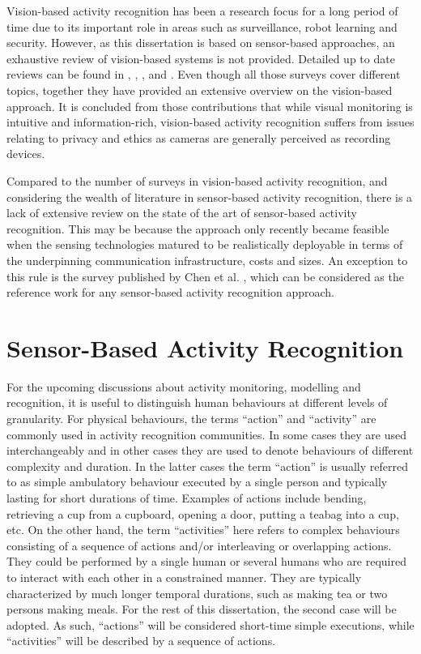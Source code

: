 Vision-based activity recognition has been a research focus for a long period of time due to its important role in areas such as surveillance, robot learning and security. However, as this dissertation is based on sensor-based approaches, an exhaustive review of vision-based systems is not provided. Detailed up to date reviews can be found in \cite{Poppe2010}, \cite{Moeslund2006}, \cite{Yilmaz2006}, \cite{Weinland2011} and \cite{Turaga2008}. Even though all those surveys cover different topics, together they have provided an extensive overview on the vision-based approach. It is concluded from those contributions that while visual monitoring is intuitive and information-rich, vision-based activity recognition suffers from issues relating to privacy and ethics \cite{Yilmaz2006} as cameras are generally perceived as recording devices.

Compared to the number of surveys in vision-based activity recognition, and considering the wealth of literature in sensor-based activity recognition, there is a lack of extensive review on the state of the art of sensor-based activity recognition. This may be because the approach only recently became feasible when the sensing technologies matured to be realistically deployable in terms of the underpinning communication infrastructure, costs and sizes. An exception to this rule is the survey published by Chen et al. \cite{Chen2012}, which can be considered as the reference work for any sensor-based activity recognition approach. 

\section{Sensor-Based Activity Recognition}
\label{sec:soa:sensor}

For the upcoming discussions about activity monitoring, modelling and recognition, it is useful to distinguish human behaviours at different levels of granularity. For physical behaviours, the terms “action” and “activity” are commonly used in activity recognition communities. In some cases they are used interchangeably and in other cases they are used to denote behaviours of different complexity and duration. In the latter cases the term “action” is usually referred to as simple ambulatory behaviour executed by a single person and typically lasting for short durations of time. Examples of actions include bending, retrieving a cup from a cupboard, opening a door, putting a teabag into a cup, etc. On the other hand, the term “activities” here refers to complex behaviours consisting of a sequence of actions and/or interleaving or overlapping actions. They could be performed by a single human or several humans who are required to interact with each other in a constrained manner. They are typically characterized by much longer temporal durations, such as making tea or two persons making meals. For the rest of this dissertation, the second case will be adopted. As such, ``actions'' will be considered short-time simple executions, while ``activities'' will be described by a sequence of actions.

